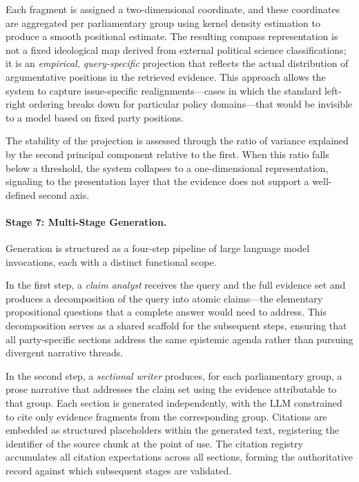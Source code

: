 Each fragment is assigned a two-dimensional coordinate, and these coordinates are
aggregated per parliamentary group using kernel density estimation to produce a smooth
positional estimate. The resulting compass representation is not a fixed ideological map
derived from external political science classifications; it is an \textit{empirical,
query-specific} projection that reflects the actual distribution of argumentative
positions in the retrieved evidence. This approach allows the system to capture
issue-specific realignments---cases in which the standard left-right ordering breaks down
for particular policy domains---that would be invisible to a model based on fixed party
positions.

The stability of the projection is assessed through the ratio of variance explained by the
second principal component relative to the first. When this ratio falls below a threshold,
the system collapses to a one-dimensional representation, signaling to the presentation
layer that the evidence does not support a well-defined second axis.

\paragraph{Stage 7: Multi-Stage Generation.}
Generation is structured as a four-step pipeline of large language model invocations, each
with a distinct functional scope.

In the first step, a \textit{claim analyst} receives the query and the full evidence set
and produces a decomposition of the query into atomic claims---the elementary
propositional questions that a complete answer would need to address. This decomposition
serves as a shared scaffold for the subsequent steps, ensuring that all party-specific
sections address the same epistemic agenda rather than pursuing divergent narrative threads.

In the second step, a \textit{sectional writer} produces, for each parliamentary group, a
prose narrative that addresses the claim set using the evidence attributable to that group.
Each section is generated independently, with the LLM constrained to cite only evidence
fragments from the corresponding group. Citations are embedded as structured placeholders
within the generated text, registering the identifier of the source chunk at the point of
use. The citation registry accumulates all citation expectations across all sections,
forming the authoritative record against which subsequent stages are validated.

